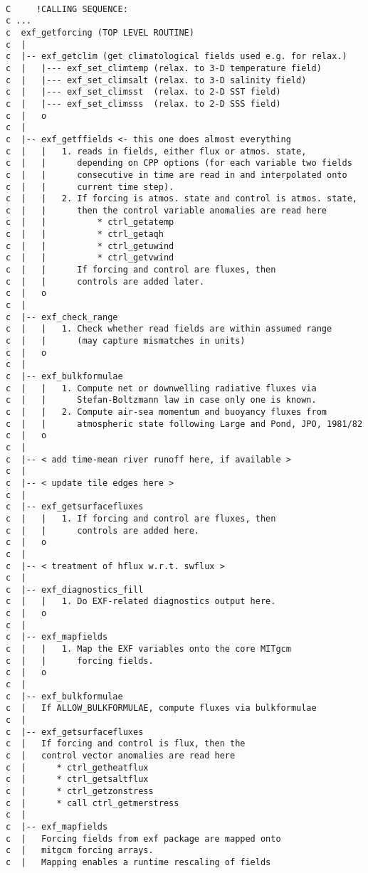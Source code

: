 {\scriptsize
\begin{verbatim}

C     !CALLING SEQUENCE:
c ...
c  exf_getforcing (TOP LEVEL ROUTINE)
c  |
c  |-- exf_getclim (get climatological fields used e.g. for relax.)
c  |   |--- exf_set_climtemp (relax. to 3-D temperature field)
c  |   |--- exf_set_climsalt (relax. to 3-D salinity field)
c  |   |--- exf_set_climsst  (relax. to 2-D SST field)
c  |   |--- exf_set_climsss  (relax. to 2-D SSS field)
c  |   o
c  |
c  |-- exf_getffields <- this one does almost everything
c  |   |   1. reads in fields, either flux or atmos. state,
c  |   |      depending on CPP options (for each variable two fields
c  |   |      consecutive in time are read in and interpolated onto
c  |   |      current time step).
c  |   |   2. If forcing is atmos. state and control is atmos. state,
c  |   |      then the control variable anomalies are read here
c  |   |          * ctrl_getatemp
c  |   |          * ctrl_getaqh
c  |   |          * ctrl_getuwind
c  |   |          * ctrl_getvwind
c  |   |      If forcing and control are fluxes, then
c  |   |      controls are added later.
c  |   o
c  |
c  |-- exf_check_range
c  |   |   1. Check whether read fields are within assumed range
c  |   |      (may capture mismatches in units)
c  |   o
c  |
c  |-- exf_bulkformulae
c  |   |   1. Compute net or downwelling radiative fluxes via
c  |   |      Stefan-Boltzmann law in case only one is known.
c  |   |   2. Compute air-sea momentum and buoyancy fluxes from
c  |   |      atmospheric state following Large and Pond, JPO, 1981/82
c  |   o
c  |
c  |-- < add time-mean river runoff here, if available >
c  |
c  |-- < update tile edges here >
c  |
c  |-- exf_getsurfacefluxes
c  |   |   1. If forcing and control are fluxes, then
c  |   |      controls are added here.
c  |   o
c  |
c  |-- < treatment of hflux w.r.t. swflux >
c  |
c  |-- exf_diagnostics_fill
c  |   |   1. Do EXF-related diagnostics output here.
c  |   o
c  |
c  |-- exf_mapfields
c  |   |   1. Map the EXF variables onto the core MITgcm
c  |   |      forcing fields.
c  |   o
c  |
c  |-- exf_bulkformulae
c  |   If ALLOW_BULKFORMULAE, compute fluxes via bulkformulae
c  |
c  |-- exf_getsurfacefluxes
c  |   If forcing and control is flux, then the
c  |   control vector anomalies are read here
c  |      * ctrl_getheatflux
c  |      * ctrl_getsaltflux
c  |      * ctrl_getzonstress
c  |      * call ctrl_getmerstress
c  |
c  |-- exf_mapfields
c  |   Forcing fields from exf package are mapped onto
c  |   mitgcm forcing arrays.
c  |   Mapping enables a runtime rescaling of fields

\end{verbatim}
}


